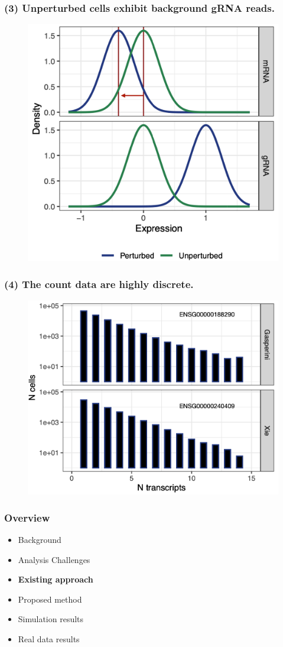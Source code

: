 \documentclass{beamer}
\begin{document}
\begin{frame}
\frametitle{(3) Unperturbed cells exhibit background gRNA reads.}
\begin{figure}
	\centering
	\includegraphics[width=0.75\linewidth]{../figures/fig1/density_plot_annotated.png}
\end{figure}
\end{frame}


\begin{frame}
\frametitle{(4) The count data are highly discrete.}
\begin{figure}
	\centering
	\includegraphics[width=0.75\linewidth]{../figures/fig1/mRNA_count_hist_annotated.png}
\end{figure}
\end{frame}


\begin{frame}
\frametitle{Overview}
\begin{itemize}
	\item Background
	\item Analysis Challenges
	\item \textbf{Existing approach}
	\item Proposed method
	\item Simulation results
	\item Real data results
\end{itemize}
\end{frame}
\end{document}

